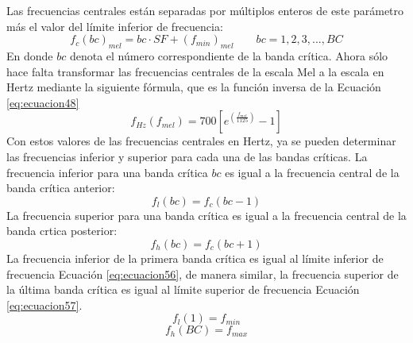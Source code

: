 \begin{enumerate}
Las frecuencias centrales están separadas por múltiplos enteros de este parámetro más el valor del límite inferior de frecuencia:
\begin{equation}
\label{eq:ecuacion52}
f_{c}(bc)_{mel} = bc \cdot SF + \left ( f_{min} \right )_{mel}
\qquad
bc = 1,2,3,...,BC
\end{equation}
En donde $bc$ denota el número correspondiente de la banda crítica. Ahora sólo hace falta transformar las frecuencias centrales de la escala Mel a la escala en Hertz mediante la siguiente fórmula, que es la función inversa de la Ecuación \eqref{eq:ecuacion48}
\begin{equation}
\label{eq:ecuacion53}
f_{Hz}(f_{mel}) = 700\left [ e^{\left ( \frac{f_{mel}}{1125} \right )} - 1 \right]
\end{equation}
Con estos valores de las frecuencias centrales en Hertz, ya se pueden determinar las frecuencias inferior y superior para cada una de las bandas críticas. La frecuencia inferior para una banda crítica $bc$ es igual a la frecuencia central de la banda crítica anterior:
\begin{equation}
\label{eq:ecuacion54}
f_{l}(bc) = f_{c}(bc - 1)
\end{equation}
La frecuencia superior para una banda crítica es igual a la frecuencia central de la banda crtica posterior:
\begin{equation}
\label{eq:ecuacion55}
f_{h}(bc) = f_{c}(bc + 1)
\end{equation}
La frecuencia inferior de la primera banda crítica es igual al límite inferior de frecuencia Ecuación \ref{eq:ecuacion56}, de manera similar, la frecuencia superior de la última banda crítica es igual al límite superior de frecuencia Ecuación \ref{eq:ecuacion57}.
\begin{equation}
\label{eq:ecuacion56}
f_{l}(1) = f_{min}
\end{equation}
\vskip -1.0cm
\begin{equation}
\label{eq:ecuacion57}
f_{h}(BC) = f_{max}
\end{equation}


\end{enumerate}
